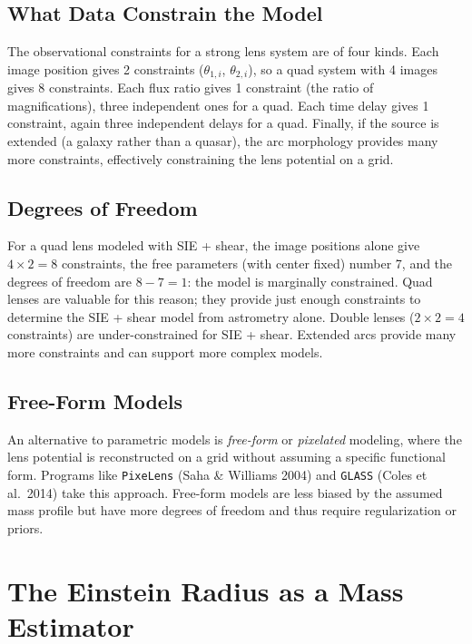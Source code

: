 \subsection{What Data Constrain the Model}

The observational constraints for a strong lens system are of four
kinds.  Each image position gives 2 constraints ($\theta_{1,i}$,
$\theta_{2,i}$), so a quad system with 4 images gives 8 constraints.
Each flux ratio gives 1 constraint (the ratio of magnifications),
three independent ones for a quad.  Each time delay gives 1
constraint, again three independent delays for a quad.  Finally, if
the source is extended (a galaxy rather than a quasar), the arc
morphology provides many more constraints, effectively constraining
the lens potential on a grid.

\subsection{Degrees of Freedom}

For a quad lens modeled with SIE + shear, the image positions alone
give $4 \times 2 = 8$ constraints, the free parameters (with center
fixed) number 7, and the degrees of freedom are $8 - 7 = 1$: the
model is marginally constrained.  Quad lenses are valuable for this
reason; they provide just enough constraints to determine the
SIE + shear model from astrometry alone.
Double lenses ($2 \times 2 = 4$ constraints) are under-constrained
for SIE + shear.  Extended arcs provide many more constraints and can
support more complex models.

\subsection{Free-Form Models}

An alternative to parametric models is \emph{free-form} or
\emph{pixelated} modeling, where the lens potential is
reconstructed on a grid without assuming a specific functional form.
Programs like \texttt{PixeLens} (Saha \& Williams 2004) and
\texttt{GLASS} (Coles et al.\ 2014) take this approach.  Free-form
models are less biased by the assumed mass profile but have more
degrees of freedom and thus require regularization or priors.


\section{The Einstein Radius as a Mass Estimator}
\label{sec:einstein_mass}

